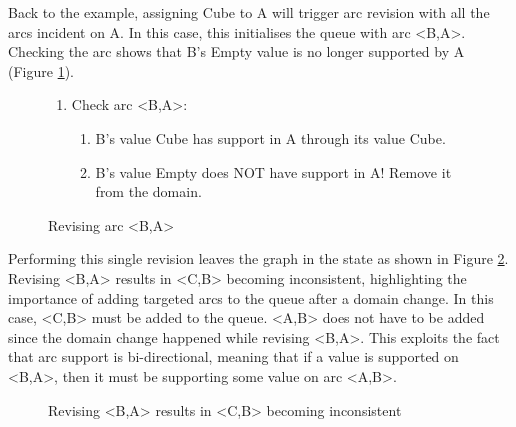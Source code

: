 Back to the example, assigning Cube to A will trigger arc revision with all the arcs incident on A. In this case, this initialises the queue with arc <B,A>. Checking the arc shows that B's Empty value is no longer supported by A (Figure \ref{fig:arcRevision}).

\begin{figure}[H]
    \begin{framed}
        \begin{enumerate}
            \item Check arc <B,A>:
                  \begin{enumerate}
                      \item B's value Cube has support in A through its value Cube.
                      \item B's value Empty does NOT have support in A! Remove it from the domain.
                  \end{enumerate}
        \end{enumerate}
    \end{framed}
    \caption{Revising arc <B,A>}
    \label{fig:arcRevision}
\end{figure}

Performing this single revision leaves the graph in the state as shown in Figure \ref{fig:arcsRevised1}. Revising <B,A> results in <C,B> becoming inconsistent, highlighting the importance of adding targeted arcs to the queue after a domain change. In this case, <C,B> must be added to the queue. <A,B> does not have to be added since the domain change happened while revising <B,A>. This exploits the fact that arc support is bi-directional, meaning that if a value is supported on <B,A>, then it must be supporting some value on arc <A,B>.

\begin{figure}[H]
    \centering

    \caption{Revising <B,A> results in <C,B> becoming inconsistent}
    \label{fig:arcsRevised1}
\end{figure}

